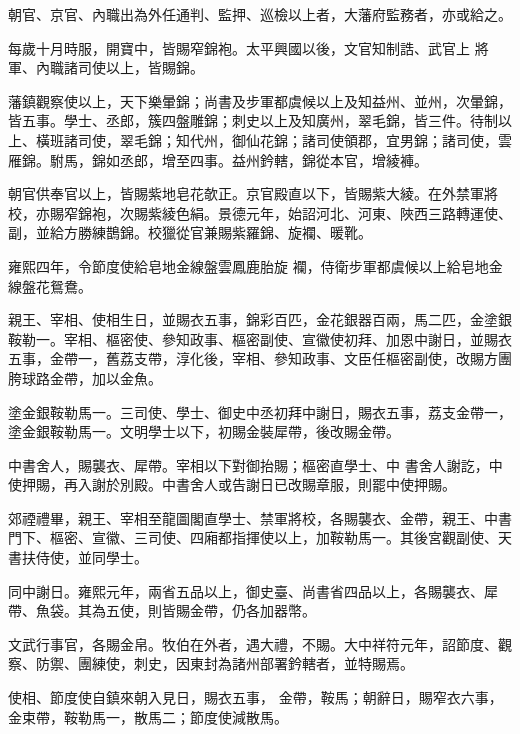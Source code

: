 \begin{pinyinscope}
 朝官、京官、內職出為外任通判、監押、巡檢以上者，大藩府監務者，亦或給之。



 每歲十月時服，開寶中，皆賜窄錦袍。太平興國以後，文官知制誥、武官上
 將軍、內職諸司使以上，皆賜錦。



 藩鎮觀察使以上，天下樂暈錦；尚書及步軍都虞候以上及知益州、並州，次暈錦，皆五事。學士、丞郎，簇四盤雕錦；刺史以上及知廣州，翠毛錦，皆三件。待制以上、橫班諸司使，翠毛錦；知代州，御仙花錦；諸司使領郡，宜男錦；諸司使，雲雁錦。駙馬，錦如丞郎，增至四事。益州鈐轄，錦從本官，增綾褲。



 朝官供奉官以上，皆賜紫地皂花欹正。京官殿直以下，皆賜紫大綾。在外禁軍將校，亦賜窄錦袍，次賜紫綾色絹。景德元年，始詔河北、河東、陜西三路轉運使、副，並給方勝練鵲錦。校獵從官兼賜紫羅錦、旋襴、暖靴。



 雍熙四年，令節度使給皂地金線盤雲鳳鹿胎旋
 襴，侍衛步軍都虞候以上給皂地金線盤花鴛鴦。



 親王、宰相、使相生日，並賜衣五事，錦彩百匹，金花銀器百兩，馬二匹，金塗銀鞍勒一。宰相、樞密使、參知政事、樞密副使、宣徽使初拜、加恩中謝日，並賜衣五事，金帶一，舊荔支帶，淳化後，宰相、參知政事、文臣任樞密副使，改賜方團胯球路金帶，加以金魚。



 塗金銀鞍勒馬一。三司使、學士、御史中丞初拜中謝日，賜衣五事，荔支金帶一，塗金銀鞍勒馬一。文明學士以下，初賜金裝犀帶，後改賜金帶。



 中書舍人，賜襲衣、犀帶。宰相以下對御抬賜；樞密直學士、中
 書舍人謝訖，中使押賜，再入謝於別殿。中書舍人或告謝日已改賜章服，則罷中使押賜。



 郊禋禮畢，親王、宰相至龍圖閣直學士、禁軍將校，各賜襲衣、金帶，親王、中書門下、樞密、宣徽、三司使、四廂都指揮使以上，加鞍勒馬一。其後宮觀副使、天書扶侍使，並同學士。



 同中謝日。雍熙元年，兩省五品以上，御史臺、尚書省四品以上，各賜襲衣、犀帶、魚袋。其為五使，則皆賜金帶，仍各加器幣。



 文武行事官，各賜金帛。牧伯在外者，遇大禮，不賜。大中祥符元年，詔節度、觀察、防禦、團練使，刺史，因東封為諸州部署鈐轄者，並特賜焉。



 使相、節度使自鎮來朝入見日，賜衣五事，
 金帶，鞍馬；朝辭日，賜窄衣六事，金束帶，鞍勒馬一，散馬二；節度使減散馬。




\end{pinyinscope}
